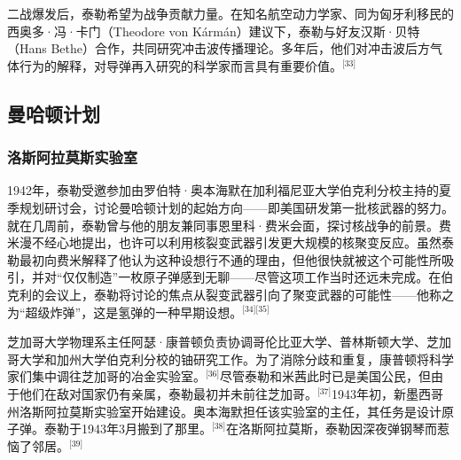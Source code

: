 二战爆发后，泰勒希望为战争贡献力量。在知名航空动力学家、同为匈牙利移民的西奥多·冯·卡门（Theodore von Kármán）建议下，泰勒与好友汉斯·贝特（Hans Bethe）合作，共同研究冲击波传播理论。多年后，他们对冲击波后方气体行为的解释，对导弹再入研究的科学家而言具有重要价值。\(^\text{[33]}\)
\subsection{曼哈顿计划}
\subsubsection{洛斯阿拉莫斯实验室}
1942年，泰勒受邀参加由罗伯特·奥本海默在加利福尼亚大学伯克利分校主持的夏季规划研讨会，讨论曼哈顿计划的起始方向——即美国研发第一批核武器的努力。就在几周前，泰勒曾与他的朋友兼同事恩里科·费米会面，探讨核战争的前景。费米漫不经心地提出，也许可以利用核裂变武器引发更大规模的核聚变反应。虽然泰勒最初向费米解释了他认为这种设想行不通的理由，但他很快就被这个可能性所吸引，并对“仅仅制造”一枚原子弹感到无聊——尽管这项工作当时还远未完成。在伯克利的会议上，泰勒将讨论的焦点从裂变武器引向了聚变武器的可能性——他称之为“超级炸弹”，这是氢弹的一种早期设想。\(^\text{[34][35]}\)

芝加哥大学物理系主任阿瑟·康普顿负责协调哥伦比亚大学、普林斯顿大学、芝加哥大学和加州大学伯克利分校的铀研究工作。为了消除分歧和重复，康普顿将科学家们集中调往芝加哥的冶金实验室。\(^\text{[36]}\)尽管泰勒和米茜此时已是美国公民，但由于他们在敌对国家仍有亲属，泰勒最初并未前往芝加哥。\(^\text{[37]}\)1943年初，新墨西哥州洛斯阿拉莫斯实验室开始建设。奥本海默担任该实验室的主任，其任务是设计原子弹。泰勒于1943年3月搬到了那里。\(^\text{[38]}\)在洛斯阿拉莫斯，泰勒因深夜弹钢琴而惹恼了邻居。\(^\text{[39]}\)

